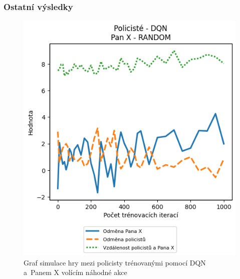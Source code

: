 \subsubsection{Ostatní výsledky}

\begin{figure}[H]
  \centering
  \begin{minipage}{.48\textwidth}
    \centering
    \includegraphics[width=1\textwidth]{obrazky-figures/graphs/cop_DQN_mrx_RANDOM}
    \caption{Graf simulace hry mezi policisty trénovanými pomocí DQN a~Panem X volícím náhodné akce}
    \label{fig:cop_dqn_mrx_random}
  \end{minipage}\hfill
  \begin{minipage}{.48\textwidth}
    \centering

\end{minipage}
\end{figure}
